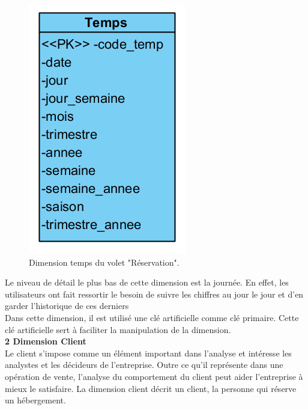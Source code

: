 \begin{figure}[!htbp]
	\begin{center}
		\includegraphics[scale=0.65]{images/dim_temps.png}
		\caption{Dimension temps du volet "Réservation".}
		\label{use_bi_tools}
	\end{center}
	\end{figure}

Le niveau de détail le plus bas de cette dimension est la journée. En effet, les utilisateurs ont fait ressortir le besoin de suivre les chiffres au jour le jour et d’en garder l'historique de ces derniers\\
Dans cette dimension, il est utilisé une clé artificielle comme clé primaire. Cette clé artificielle sert à faciliter la manipulation de la dimension.\\

\textbf{2 Dimension Client}\\
Le client s’impose comme un élément important dans l’analyse et intéresse les analystes et les décideurs de l’entreprise. Outre ce qu’il représente dans une opération de vente, l’analyse du comportement du client peut aider l’entreprise à mieux le satisfaire. La dimension client décrit un client, la personne qui réserve un hébergement.

